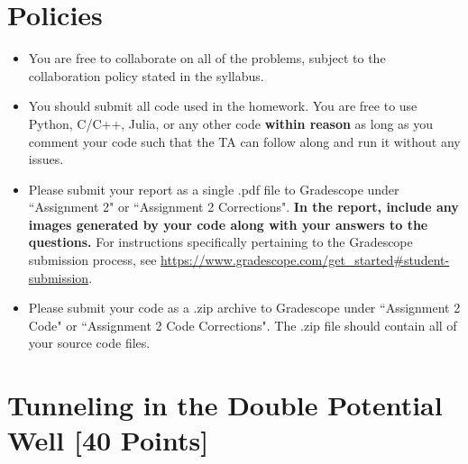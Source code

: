 \newif\ifshowsolutions
\showsolutionsfalse




\pagestyle{fancy}

\section*{Policies}
\begin{itemize}
  \item You are free to collaborate on all of the problems, subject to the collaboration policy stated in the syllabus.
  \item You should submit all code used in the homework.
        You are free to use Python, C/C++, Julia, or any other code \textbf{within reason} as long as you comment your code such that the TA can follow along and run it without any issues.
  \item Please submit your report as a single .pdf file to Gradescope under ``Assignment 2" or ``Assignment 2 Corrections".
        \textbf{In the report, include any images generated by your code along with your answers to the questions.}
        For instructions specifically pertaining to the Gradescope submission process, see \url{https://www.gradescope.com/get_started#student-submission}.
  \item Please submit your code as a .zip archive to Gradescope under ``Assignment 2 Code" or ``Assignment 2 Code Corrections".
        The .zip file should contain all of your source code files.
\end{itemize}

\newpage
\section{Tunneling in the Double Potential Well [40 Points]}

